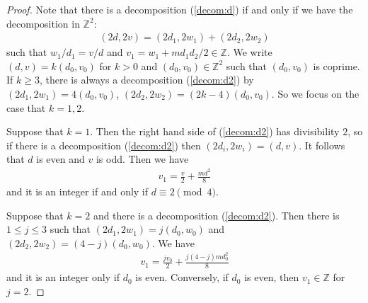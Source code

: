 \documentclass [11pt,oneside,a4paper,mathscr]{amsart}
\theoremstyle{definition}
\renewcommand{\leq}{\leqslant}
\renewcommand{\geq}{\geqslant}
\begin{document}
\begin{proof}
Note that there is a decomposition (\ref{decom:d})
if and only if we have the decomposition in $\mathbb{Z}^2$:
\begin{align}\label{decom:d2}
    (2d, 2v)=(2d_1, 2w_1)+(2d_2, 2w_2)
\end{align}
such that 
$w_1/d_1=v/d$ and 
$v_1=w_1+m d_1 d_2/2 \in \mathbb{Z}$. 
We write $(d, v)=k(d_0, v_0)$ for $k>0$ and $(d_0, v_0) \in \mathbb{Z}^2$
such that $(d_0, v_0)$
is coprime. If $k\geq 3$, there is always
a decomposition (\ref{decom:d2})
by $(2d_1, 2w_1)=4(d_0, v_0)$, 
$(2d_2, 2w_2)=(2k-4)(d_0, v_0)$. 
So we focus on the case that $k=1, 2$. 

Suppose that $k=1$. 
Then the right hand side of (\ref{decom:d2}) 
has divisibility $2$, so if there is a decomposition (\ref{decom:d2})
then 
$(2d_i, 2w_i)=(d, v)$. 
It follows that $d$ is even and $v$ is odd. 
Then we have  
\begin{align*}v_1=\frac{v}{2}+\frac{md^2}{8}
\end{align*}
and it is an integer if and only if $d \equiv 2 \pmod 4$. 

Suppose that $k=2$ and there is a decomposition (\ref{decom:d2}). 
Then there is $1\leq j\leq 3$ 
such that $(2d_1, 2w_1)=j(d_0, w_0)$
and $(2d_2, 2w_2)=(4-j)(d_0, w_0)$. We have 
\begin{align*}v_1=\frac{jv_0}{2}+\frac{j(4-j)md_0^2}{8}
\end{align*}
and it is an integer only if $d_0$ is even. Conversely, if $d_0$ is even, 
then $v_1 \in \mathbb{Z}$ for $j=2$. 
\end{proof}
\end{document}
